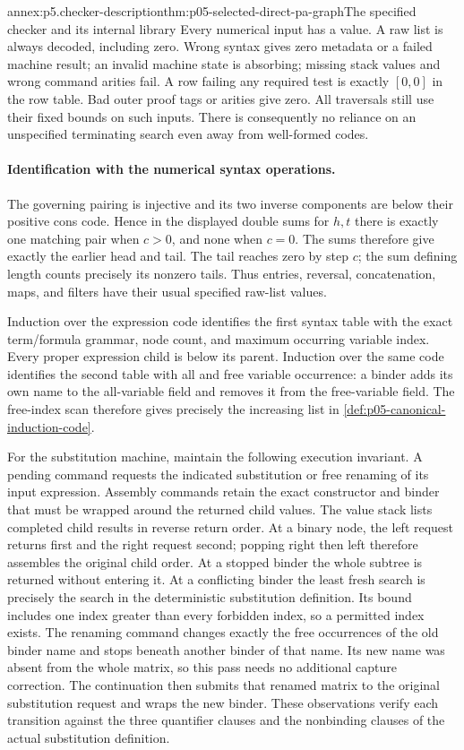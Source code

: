 \begin{annexitem}{annex:p5.checker-description}{thm:p05-selected-direct-pa-graph}{The specified checker and its internal library}
Every numerical input has a value.  A raw list is always decoded, including
zero.  Wrong syntax gives zero metadata or a failed machine result; an invalid
machine state is absorbing; missing stack values and wrong command arities
fail.  A row failing any required test is exactly \([0,0]\) in the row table.
Bad outer proof tags or arities give zero.  All traversals still use their
fixed bounds on such inputs.  There is consequently no reliance on an
unspecified terminating search even away from well-formed codes.

\paragraph{Identification with the numerical syntax operations.}
The governing pairing is injective and its two inverse components are below
their positive cons code.  Hence in the displayed double sums for \(h,t\)
there is exactly one matching pair when \(c>0\), and none when \(c=0\).
The sums therefore give exactly the earlier head and tail.  The tail reaches
zero by step \(c\); the sum defining length counts precisely its nonzero
tails.  Thus entries, reversal, concatenation, maps, and filters have their
usual specified raw-list values.

Induction over the expression code identifies the first syntax table with the
exact term/formula grammar, node count, and maximum occurring variable index.
Every proper expression child is below its parent.  Induction over the same
code identifies the second table with all and free variable occurrence: a
binder adds its own name to the all-variable field and removes it from the
free-variable field.  The free-index scan therefore gives precisely the
increasing list in \cref{def:p05-canonical-induction-code}.

For the substitution machine, maintain the following execution invariant.
A pending command requests the indicated substitution or free renaming of its
input expression.  Assembly commands retain the exact constructor and binder
that must be wrapped around the returned child values.  The value stack lists
completed child results in reverse return order.  At a binary node, the left
request returns first and the right request second; popping right then left
therefore assembles the original child order.  At a stopped binder the whole
subtree is returned without entering it.  At a conflicting binder the least
fresh search is precisely the search in the deterministic substitution
definition.  Its bound includes one index greater than every forbidden index,
so a permitted index exists.  The renaming command changes exactly the free
occurrences of the old binder name and stops beneath another binder of that
name.  Its new name was absent from the whole matrix, so this pass needs no
additional capture correction.  The continuation then submits that renamed
matrix to the original substitution request and wraps the new binder.
These observations verify each transition against the three quantifier
clauses and the nonbinding clauses of the actual substitution definition.


\end{annexitem}
